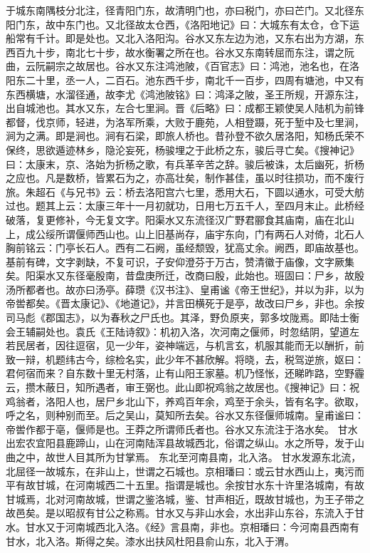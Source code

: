 \documentclass[12pt,UTF8]{ctexbook}
\begin{document}
于城东南隅枝分北注，径青阳门东，故清明门也，亦曰税门，亦曰芒门。又北径东阳门东，故中东门也。又北径故太仓西，《洛阳地记》曰：大城东有太仓，仓下运船常有千计。即是处也。又北入洛阳沟。谷水又东左边为池，又东右出为方湖，东西百九十步，南北七十步，故水衡署之所在也。谷水又东南转屈而东注，谓之阮曲，云阮嗣宗之故居也。谷水又东注鸿池陂，《百官志》曰：鸿池，池名也，在洛阳东二十里，丞一人，二百石。池东西千步，南北千一百步，四周有塘池，中又有东西横塘，水溜径通，故李尤《鸿池陂铭》曰：鸿泽之陂，圣王所规，开源东注，出自城池也。其水又东，左合七里涧。晋《后略》曰：成都王颖使吴人陆机为前锋都督，伐京师，轻进，为洛军所乘，大败于鹿苑，人相登蹑，死于堑中及七里涧，涧为之满。即是涧也。涧有石梁，即旅人桥也。昔孙登不欲久居洛阳，知杨氏荣不保终，思欲遁迹林乡，隐沦妄死，杨骏埋之于此桥之东，骏后寻亡矣。《搜神记》曰：太康末，京、洛始为折杨之歌，有兵革辛苦之辞。骏后被诛，太后幽死，折杨之应也。凡是数桥，皆累石为之，亦高壮矣，制作甚佳，虽以时往损功，而不废行旅。朱超石《与兄书》云：桥去洛阳宫六七里，悉用大石，下圆以通水，可受大舫过也。题其上云：太康三年十一月初就功，日用七万五千人，至四月末止。此桥经破落，复更修补，今无复文字。阳渠水又东流径汉广野君郦食其庙南，庙在北山上，成公绥所谓偃师西山也。山上旧基尚存，庙宇东向，门有两石人对倚，北石人胸前铭云：门亭长石人。西有二石阙，虽经颓毁，犹高丈余。阙西，即庙故基也。基前有碑，文字剥缺，不复可识，子安仰澄芬于万古，赞清徽于庙像，文字厥集矣。阳渠水又东径毫殷南，昔盘庚所迁，改商曰殷，此始也。班固曰：尸乡，故殷汤所都者也。故亦曰汤亭。薛瓒《汉书注》、皇甫谧《帝王世纪》，并以为非，以为帝喾都矣。《晋太康记》、《地道记》，并言田横死于是亭，故改曰尸乡，非也。余按司马彪《郡国志》，以为春秋之尸氏也。其泽，野负原夹，郭多坟陇焉。即陆士衡会王辅嗣处也。袁氏《王陆诗叙》：机初入洛，次河南之偃师，时忽结阴，望道左若民居者，因往逗宿，见一少年，姿神端远，与机言玄，机服其能而无以酬折，前致一辩，机题纬古今，综检名实，此少年不甚欣解。将晓，去，税驾逆旅，妪曰：君何宿而来？自东数十里无村落，止有山阳王家墓。机乃怪怅，还睇昨路，空野霾云，攒木蔽日，知所遇者，审王弼也。此山即祝鸡翁之故居也。《搜神记》曰：祝鸡翁者，洛阳人也，居尸乡北山下，养鸡百年余，鸡至于余头，皆有名字。欲取，呼之名，则种别而至。后之吴山，莫知所去矣。谷水又东径偃师城南。皇甫谧曰：帝喾作都于亳，偃师是也。王莽之所谓师氏者也。谷水又东流注于洛水矣。
甘水出宏农宜阳县鹿蹄山，山在河南陆浑县故城西北，俗谓之纵山。水之所导，发于山曲之中，故世人目其所为甘掌焉。
东北至河南县南，北入洛。
甘水发源东北流，北屈径一故城东，在非山上，世谓之石城也。京相璠曰：或云甘水西山上，夷污而平有故甘城，在河南城西二十五里。指谓是城也。余按甘水东十许里洛城南，有故甘城焉，北对河南故城，世谓之鉴洛城，鉴、甘声相近，既故甘城也，为王子带之故邑矣。是以昭叔有甘公之称焉。甘水又与非山水会，水出非山东谷，东流入于甘水。甘水又于河南城西北入洛。《经》言县南，非也。京相璠曰：今河南县西南有甘水，北入洛。斯得之矣。漆水出扶风杜阳县俞山东，北入于渭。
\end{document}
